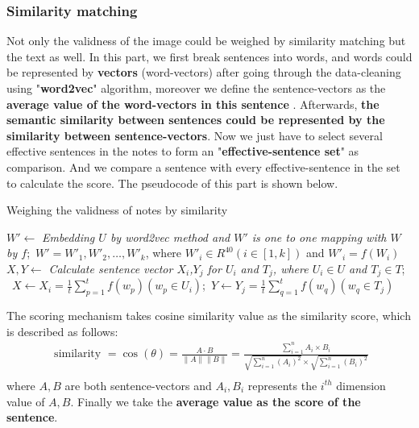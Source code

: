 \documentclass{mcmthesis}
\begin{document}
	\subsubsection{Similarity matching}
	\quad Not only the validness of the image could be weighed by similarity matching but the text as well. In this part, we first break sentences into words, and words could be represented by \textbf{vectors} (word-vectors) after going through the data-cleaning using "\textbf{word2vec}" algorithm, moreover we define the sentence-vectors as the \textbf{average value of the word-vectors in this sentence} \cite{Word}. Afterwards, \textbf{the semantic similarity between sentences could be represented by the similarity between sentence-vectors}. Now we just have to select several effective sentences in the notes to form an "\textbf{effective-sentence set}" as comparison. And we compare a sentence with every effective-sentence in the set to calculate the score. The pseudocode of this part is shown below.\\
	\begin{algorithm}[t]
		\caption{Weighing the validness of notes by similarity}
		\label{algo:event}
		\LinesNumbered
		{
			$W' \leftarrow$ \emph{Embedding $U$ by word2vec method and $W'$ is one to one mapping with $W$ by $f$};\
			$W'=W'_1,W'_2,\dots,W'_k$, where $W'_i \in R^{40}\left(i \in \left[1,k\right]\right)$ and $W'_i=f(W_i)$ \\
		}
		$X,Y \leftarrow$ \emph{Calculate sentence vector $X_i$,$Y_j$ for $U_i$ and $T_j$, where $U_i \in U$ and $T_j \in T$}; \
		$X \leftarrow X_i= \frac{1}{t} \sum_{p=1}^{t} f(w_p) (w_p \in U_i)$;\
		$Y \leftarrow Y_j= \frac{1}{t} \sum_{q=1}^{t} f(w_q) (w_q \in T_j)$
		
			\end{algorithm}
	\quad The scoring mechanism takes cosine similarity value as the similarity score, which is described as follows:
	\begin{align*}
		\text { similarity }=\cos (\theta)=\frac{A \cdot B}{\|A\|\|B\|}=\frac{\sum_{i=1}^{n} A_{i} \times B_{i}}{\sqrt{\sum_{i=1}^{n}\left(A_{i}\right)^{2}} \times \sqrt{\sum_{i=1}^{n}\left(B_{i}\right)^{2}}}\\
	\end{align*} 
	where $A,B$ are both sentence-vectors and $A_i,B_i$ represents the $i^{th}$ dimension value of $A,B$. Finally we take the \textbf{average value as the score of the sentence}.
\end{document}
